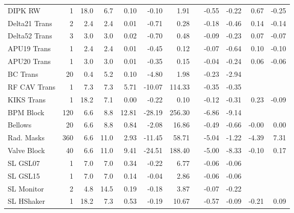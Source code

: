 \begin{sidewaystable}
{\begin{tabular}{l d{0} d{-1} d{-1} d{-1} d{-1} d{-1} c d{-1} d{-1} d{-1} d{-1}}
            DIPK RW        &  1   &  18.0  &  6.7    &   0.10 &   -0.10 &    1.91 & &   -0.55 &   -0.22 &   0.67 &  -0.25 \\
            Delta21 Trans  &  2   &  2.4   &  2.4    &   0.01 &   -0.71 &    0.28 & &   -0.18 &   -0.46 &   0.14 &  -0.14 \\
            Delta52 Trans  &  3   &  3.0   &  3.0    &   0.02 &   -0.70 &    0.48 & &   -0.09 &   -0.23 &   0.07 &  -0.07 \\
            APU19 Trans    &  1   &  2.4   &  2.4    &   0.01 &   -0.45 &    0.12 & &   -0.07 &   -0.64 &   0.10 &  -0.10 \\
            APU20 Trans    &  1   &  3.0   &  3.0    &   0.01 &   -0.35 &    0.15 & &   -0.04 &   -0.24 &   0.06 &  -0.06 \\
            BC Trans       &  20  &  0.4   &  5.2    &   0.10 &   -4.80 &    1.98 & &   -0.23 &   -2.94 &        &        \\
            RF CAV Trans   &  1   &  7.3   &  7.3    &   5.71 &  -10.07 &  114.33 & &   -0.35 &   -0.35 &        &        \\
            KIKS Trans     &  1   &  18.2  &  7.1    &   0.00 &   -0.22 &    0.10 & &   -0.12 &   -0.31 &   0.23 &  -0.09 \\
            BPM Block      & 120  &  6.6   &  8.8    &  12.81 &  -28.19 &  256.30 & &   -6.86 &   -9.14 &        &        \\
            Bellows        &  20  &  6.6   &  8.8    &   0.84 &   -2.08 &   16.86 & &   -0.49 &   -0.66 &  -0.00 &   0.00 \\
            Rad. Masks     & 360  &  6.6   &  11.0   &   2.93 &  -11.45 &   58.71 & &   -5.04 &   -1.22 &  -4.39 &   7.31 \\
            Valve Block    &  40  &  6.6   &  11.0   &   9.41 &  -24.51 &  188.40 & &   -5.00 &   -8.33 &  -0.10 &   0.17 \\
            SL GSL07       &  1   &  7.0   &  7.0    &   0.34 &   -0.22 &    6.77 & &   -0.06 &   -0.06 &        &        \\
            SL GSL15       &  1   &  7.0   &  7.0    &   0.14 &   -0.04 &    2.86 & &   -0.06 &   -0.06 &        &        \\
            SL Monitor     &  2   &  4.8   &  14.5   &   0.19 &   -0.18 &    3.87 & &   -0.07 &   -0.22 &        &        \\
            SL HShaker     &  1   &  18.2  &  7.3    &   0.53 &   -0.19 &   10.67 & &   -0.57 &   -0.09 &  -0.21 &   0.09 \\

\end{tabular}}
\end{sidewaystable}
